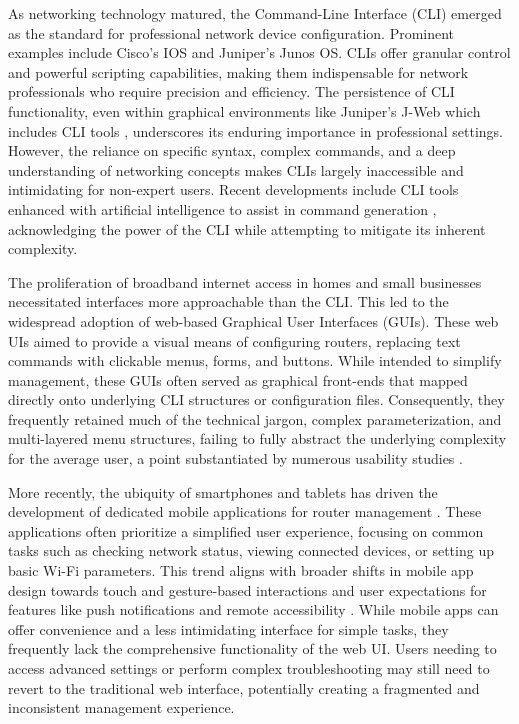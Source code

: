 As networking technology matured, the Command-Line Interface (CLI) emerged as the standard for professional network device configuration. Prominent examples include Cisco's IOS and Juniper's Junos OS. CLIs offer granular control and powerful scripting capabilities, making them indispensable for network professionals who require precision and efficiency. The persistence of CLI functionality, even within graphical environments like Juniper's J-Web which includes CLI tools \cite{router_guide}, underscores its enduring importance in professional settings. However, the reliance on specific syntax, complex commands, and a deep understanding of networking concepts makes CLIs largely inaccessible and intimidating for non-expert users. Recent developments include CLI tools enhanced with artificial intelligence to assist in command generation \cite{nlp_cybersecurity}, acknowledging the power of the CLI while attempting to mitigate its inherent complexity.

The proliferation of broadband internet access in homes and small businesses necessitated interfaces more approachable than the CLI. This led to the widespread adoption of web-based Graphical User Interfaces (GUIs). These web UIs aimed to provide a visual means of configuring routers, replacing text commands with clickable menus, forms, and buttons. While intended to simplify management, these GUIs often served as graphical front-ends that mapped directly onto underlying CLI structures or configuration files. Consequently, they frequently retained much of the technical jargon, complex parameterization, and multi-layered menu structures, failing to fully abstract the underlying complexity for the average user, a point substantiated by numerous usability studies \cite{home_network_challenges}.

More recently, the ubiquity of smartphones and tablets has driven the development of dedicated mobile applications for router management \cite{parental_controls_value}. These applications often prioritize a simplified user experience, focusing on common tasks such as checking network status, viewing connected devices, or setting up basic Wi-Fi parameters. This trend aligns with broader shifts in mobile app design towards touch and gesture-based interactions \cite{parental_controls_value} and user expectations for features like push notifications and remote accessibility \cite{parental_controls_value}. While mobile apps can offer convenience and a less intimidating interface for simple tasks, they frequently lack the comprehensive functionality of the web UI. Users needing to access advanced settings or perform complex troubleshooting may still need to revert to the traditional web interface, potentially creating a fragmented and inconsistent management experience.

